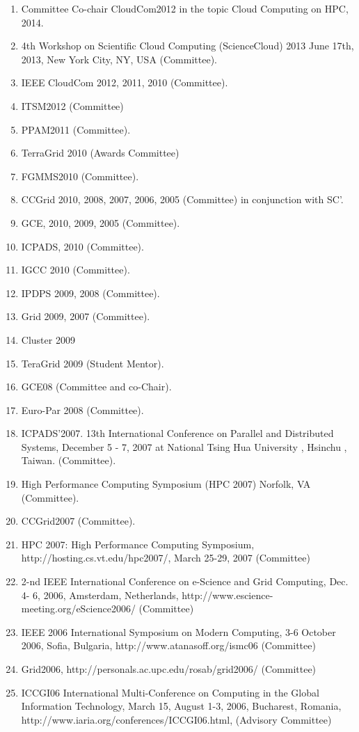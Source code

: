 \documentclass{article}
\begin{document}
\begin{enumerate}
\item  Committee Co-chair CloudCom2012 in the topic Cloud Computing on HPC, 2014.  
\item  4th Workshop on Scientific Cloud Computing (ScienceCloud) 2013 June 17th, 2013, New York City, NY, USA (Committee).
\item  IEEE CloudCom 2012, 2011, 2010 (Committee).
\item  ITSM2012 (Committee)
\item  PPAM2011 (Committee).
\item  TerraGrid 2010 (Awards Committee)
\item  FGMMS2010 (Committee).
\item  CCGrid 2010, 2008, 2007, 2006, 2005 (Committee) in conjunction with SC’.
\item  GCE, 2010, 2009, 2005 (Committee).
\item  ICPADS, 2010 (Committee).
\item  IGCC 2010 (Committee).
\item  IPDPS 2009, 2008 (Committee).
\item  Grid 2009, 2007 (Committee).
\item  Cluster 2009 
\item  TeraGrid 2009 (Student Mentor).
\item  GCE08 (Committee and co-Chair).
\item  Euro-Par 2008 (Committee).
\item  ICPADS'2007. 13th International Conference on Parallel and Distributed Systems, December 5 - 7, 2007 at National Tsing Hua University , Hsinchu , Taiwan. (Committee). 
\item  High Performance Computing Symposium (HPC 2007) Norfolk, VA (Committee). 
\item  CCGrid2007 (Committee). 
\item  HPC 2007: High Performance Computing Symposium, http://hosting.cs.vt.edu/hpc2007/, March 25-29, 2007 (Committee) 
\item  2-nd IEEE International Conference on e-Science and Grid Computing, Dec. 4- 6, 2006, Amsterdam, Netherlands, http://www.escience-meeting.org/eScience2006/ (Committee) 
\item  IEEE 2006 International Symposium on Modern Computing, 3-6 October 2006, Sofia, Bulgaria, http://www.atanasoff.org/ismc06 (Committee) 
\item  Grid2006, http://personals.ac.upc.edu/rosab/grid2006/ (Committee) 
\item  ICCGI06 International Multi-Conference on Computing in the Global Information Technology, March 15, August 1-3, 2006, Bucharest, Romania, http://www.iaria.org/conferences/ICCGI06.html, (Advisory Committee) 

\end{enumerate}
\end{document}
